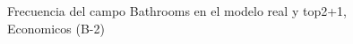 \begin{figure}[H]
    \centering
    
    \caption{Frecuencia del campo Bathrooms en el modelo real y top2+1, Economicos (B-2)}
    \label{frecuency-Bathrooms-top2+1}
\end{figure}